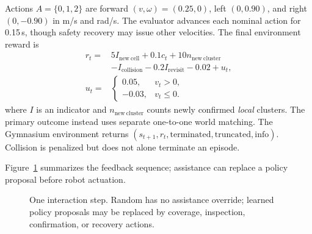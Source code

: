 \documentclass[conference]{IEEEtran}
\begin{document}
Actions $A=\{0,1,2\}$ are forward $(v,\omega)=(0.25,0)$, left $(0,0.90)$, and right $(0,-0.90)$ in m/s and rad/s. The evaluator advances each nominal action for 0.15\,s, though safety recovery may issue other velocities. The final environment reward is
\begin{equation}
\begin{aligned}
r_t={}&5I_{\mathrm{new\ cell}}+0.1c_t
+10n_{\mathrm{new\ cluster}}\\
&-I_{\mathrm{collision}}-0.2I_{\mathrm{revisit}}-0.02+u_t,\\
u_t={}&\begin{cases}0.05,&v_t>0,\\-0.03,&v_t\leq0.\end{cases}
\end{aligned}
\label{eq:reward}
\end{equation}
where $I$ is an indicator and $n_{\mathrm{new\ cluster}}$ counts newly confirmed \emph{local} clusters. The primary outcome instead uses separate one-to-one world matching. The Gymnasium environment returns $(s_{t+1},r_t,\mathrm{terminated},\mathrm{truncated},\mathrm{info})$. Collision is penalized but does not alone terminate an episode.

Figure~\ref{fig:loop} summarizes the feedback sequence; assistance can replace a policy proposal before robot actuation.

\begin{figure}[t]
\centering
{}
\caption{One interaction step. Random has no assistance override; learned policy proposals may be replaced by coverage, inspection, confirmation, or recovery actions.}
\label{fig:loop}
\end{figure}
\end{document}
